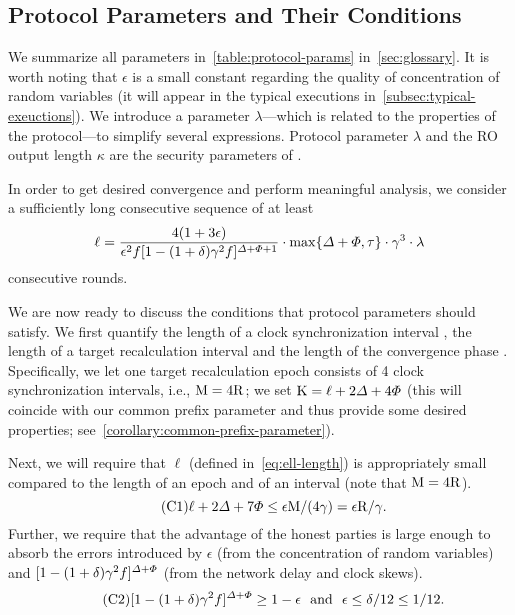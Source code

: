 \subsection{Protocol Parameters and Their Conditions}
\label{subsec:protocl-params-conditions}

We summarize all \timekeeper parameters in~\cref{table:protocol-params} in~\cref{sec:glossary}.
%
It is worth noting that $\epsilon$ is a small constant regarding the quality of
concentration of random variables (it will appear in the typical executions in~\cref{subsec:typical-exeuctions}).
%
We introduce a parameter $\lambda$---which is related to the properties of the protocol---to simplify several expressions.
%
Protocol parameter $\lambda$ and the RO output length $\kappa$ are the security parameters of \timekeeper.

In order to get desired convergence and perform meaningful analysis, we consider
a sufficiently long consecutive sequence of at least
%
\begin{equation} \label{eq:ell-length}
    \ell = \frac{4(1 + 3\epsilon)}{\epsilon^2 f [1 - (1 + \delta) \gamma^2 f]^{\varDelta + \varPhi + 1}} \cdot \max \{\varDelta + \varPhi, \tau\} \cdot \gamma^3 \cdot \lambda
\end{equation}
%
consecutive rounds.

We are now ready to discuss the conditions that protocol parameters should satisfy.
%
We first quantify the length of a clock synchronization interval \syncLen, the length of a target recalculation interval \diffLen and the length of the convergence phase \CPLen.
%
Specifically, we let one target recalculation epoch consists of 4 clock synchronization intervals, i.e., $\mathrm{M} = 4 \mathrm{R}$; we set $\mathrm{K} = \ell + 2\varDelta + 4\varPhi$ (this will coincide with our common prefix parameter and thus provide some desired properties; see~\cref {corollary:common-prefix-parameter}).

Next, we will require that $\ell$ (defined in~\cref{eq:ell-length}) is appropriately small compared to the length of an epoch and of an interval (note that $\mathrm{M} = 4 \mathrm{R}$).
%
\begin{equation*} \label{condition:min-length} \tag{C1}
    \ell + 2\varDelta + 7\varPhi \le \epsilon \mathrm{M} / (4 \gamma) = \epsilon \mathrm{R} / \gamma.
\end{equation*}
%
Further, we require that the advantage of the honest parties is large enough to absorb the errors introduced by $\epsilon$ (from the concentration of random variables) and $[1 - (1 + \delta) \gamma^2 f]^{\varDelta + \varPhi}$ (from the network delay and clock skews).
%
\begin{equation*} \label{condition:absorb-error} \tag{C2}
    [1 - (1 + \delta) \gamma^2 f]^{\varDelta + \varPhi} \ge 1 - \epsilon ~~\text{and}~~ \epsilon \le \delta / 12 \le 1 / 12.
\end{equation*}
